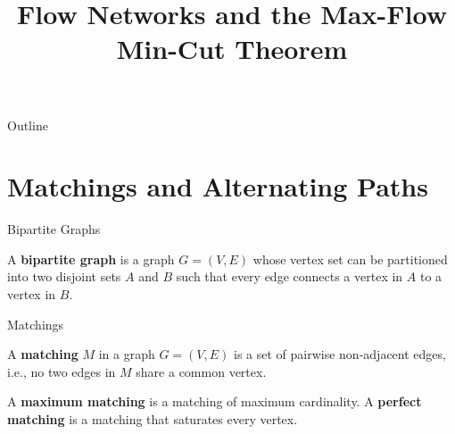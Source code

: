 \documentclass[aspectratio=169]{beamer}
\title{Flow Networks and the Max-Flow Min-Cut Theorem}
\author{}
\date{}
\begin{document}
\begin{frame}
  \titlepage
\end{frame}

\begin{frame}{Outline}
  \tableofcontents
\end{frame}

\section{Matchings and Alternating Paths}

\begin{frame}{Bipartite Graphs}
  \begin{definition}
    A \textbf{bipartite graph} is a graph $G = (V, E)$ whose vertex set can be
    partitioned into two disjoint sets $A$ and $B$ such that every edge connects
    a vertex in $A$ to a vertex in $B$.
  \end{definition}

  \vspace{1em}
  \begin{center}
  \end{center}
\end{frame}

\begin{frame}{Matchings}
  \begin{definition}
    A \textbf{matching} $M$ in a graph $G = (V, E)$ is a set of pairwise
    non-adjacent edges, i.e., no two edges in $M$ share a common vertex.
  \end{definition}

  \begin{definition}
    A \textbf{maximum matching} is a matching of maximum cardinality.
    A \textbf{perfect matching} is a matching that saturates every vertex.
  \end{definition}

  \vspace{0.5em}
\end{frame}
\end{document}
